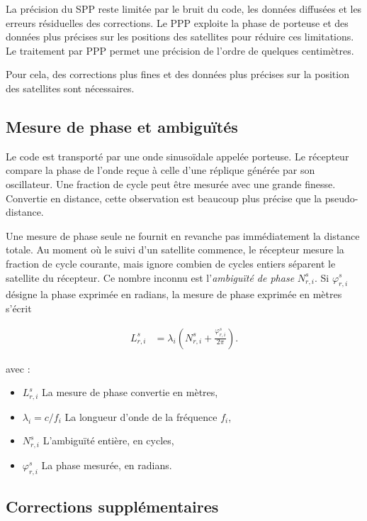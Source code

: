 La précision du SPP reste limitée par le bruit du code, les données
diffusées et les erreurs résiduelles des corrections. Le PPP exploite la
phase de porteuse et des données plus précises sur les positions des satellites pour réduire ces limitations.
Le traitement par PPP permet une précision de l'ordre de quelques centimètres.

Pour cela, des corrections plus fines et des données plus précises sur la
position des satellites sont nécessaires.



\subsection{Mesure de phase et ambiguïtés}
\label{new:phase_section}

Le code est transporté par une onde sinusoïdale appelée porteuse. Le
récepteur compare la phase de l'onde reçue à celle d'une réplique générée par
son oscillateur. Une fraction de cycle peut être mesurée avec une grande
finesse. Convertie en distance, cette observation est beaucoup plus précise
que la pseudo-distance.

Une mesure de phase seule ne fournit en revanche pas immédiatement la distance
totale. Au moment où le suivi d'un satellite commence, le récepteur mesure la
fraction de cycle courante, mais ignore combien de cycles entiers séparent le
satellite du récepteur. Ce nombre inconnu est l'\emph{ambiguïté de phase} $N_{r,i}^s$. Si
$\varphi_{r,i}^s$ désigne la phase exprimée en radians, la mesure
de phase exprimée en mètres s'écrit

\begin{align}
L_{r,i}^s
&=
\lambda_i
\left(
N_{r,i}^s+\frac{\varphi_{r,i}^s}{2\pi}
\right).
\label{eq:carrier_phase_definition}
\end{align}

avec :

\begin{itemize}
    \item $L_{r,i}^s$ La mesure de phase convertie en mètres,
    \item $\lambda_i=c/f_i$ La longueur d'onde de la fréquence $f_i$,
    \item $N_{r,i}^s$ L'ambiguïté entière, en cycles,
    \item $\varphi_{r,i}^s$ La phase mesurée, en radians.
\end{itemize}


\subsection{Corrections supplémentaires}

